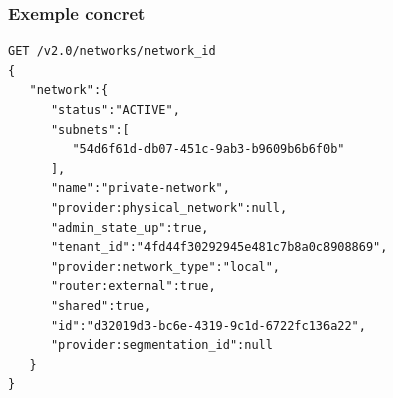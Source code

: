   \begin{frame}[containsverbatim]
    \frametitle{Exemple concret}
\begin{verbatim}
GET /v2.0/networks/network_id
{
   "network":{
      "status":"ACTIVE",
      "subnets":[
         "54d6f61d-db07-451c-9ab3-b9609b6b6f0b"
      ],
      "name":"private-network",
      "provider:physical_network":null,
      "admin_state_up":true,
      "tenant_id":"4fd44f30292945e481c7b8a0c8908869",
      "provider:network_type":"local",
      "router:external":true,
      "shared":true,
      "id":"d32019d3-bc6e-4319-9c1d-6722fc136a22",
      "provider:segmentation_id":null
   }
}
\end{verbatim}
  \end{frame}

